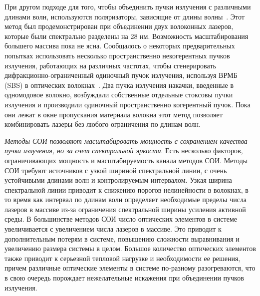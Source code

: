 При другом подходе для того, чтобы объединить пучки излучения с различными длинами волн, используются поляризаторы, зависящие от длины волны~\cite{Jain98}. Этот метод был продемонстрирован при объединении двух волоконных лазеров, которые были спектрально разделены на 28 нм. Возможность масштабирования большего массива пока не ясна. Сообщалось о некоторых предварительных попытках использовать несколько пространственно некогерентных пучков излучения, работающих на различных частотах, чтобы сгенерировать дифракционно-ограниченный одиночный пучок излучения, используя ВРМБ (SBS) в оптических волокнах~\cite{Jain109}. Два пучка излучения накачки, введенные в одномодовое волокно, возбуждали собственные отдельные стоксовы пучки излучения и производили одиночный пространственно когерентный пучок. Пока они лежат в окне пропускания материала волокна этот метод позволяет комбинировать лазеры без любого ограничения по длинам волн.

\textit{Методы СОИ позволяют масштабировать мощность с сохранением качества пучка излучения, но за счет спектральной яркости}. Есть несколько факторов, ограничивающих мощность и масштабируемость канала методов СОИ. Методы СОИ требуют источников с узкой шириной спектральной линии, с очень устойчивыми длинами волн и контролируемым интервалом. Узкая ширина спектральной линии приводит к снижению порогов нелинейности в волокнах, в то время как интервал по длинам волн определяет необходимые пределы числа лазеров в массиве из-за ограничения спектральной ширины усиления активной среды. В большинстве методов СОИ число оптических элементов в системе увеличивается с увеличением числа лазеров в массиве. Это приводит к дополнительным потерям в системе, повышению сложности выравнивания и увеличению размера системы в целом. Большое количество оптических элементов также приводит к серьезной тепловой нагрузке и необходимости ее решения, причем различные оптические элементы в системе по-разному разогреваются, что в свою очередь порождает нежелательные искажения при объединении пучков излучения.

